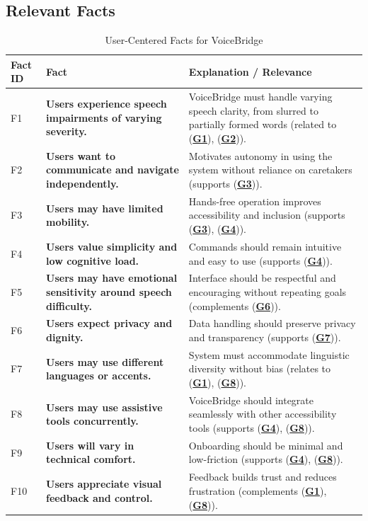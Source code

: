 \documentclass[11pt]{article}
\begin{document}
\subsection{Relevant Facts}

\begin{table}[H]
\centering
\begin{tabularx}{\textwidth}{p{1cm}p{6cm}X}
\toprule {\textbf{Fact ID}} & {\textbf{Fact}} & {\textbf{Explanation / Relevance}}\\
\midrule
F1 & \textbf{Users experience speech impairments of varying severity.} & VoiceBridge must handle varying speech clarity, from slurred to partially formed words (related to (\textbf{\hyperref[tab:project-goals]{G1}}), (\textbf{\hyperref[tab:project-goals]{G2}})). \\ \hline
F2 & \textbf{Users want to communicate and navigate independently.} & Motivates autonomy in using the system without reliance on caretakers (supports (\textbf{\hyperref[tab:project-goals]{G3}})). \\ \hline
F3 & \textbf{Users may have limited mobility.} & Hands-free operation improves accessibility and inclusion (supports (\textbf{\hyperref[tab:project-goals]{G3}}), (\textbf{\hyperref[tab:project-goals]{G4}})). \\ \hline
F4 & \textbf{Users value simplicity and low cognitive load.} & Commands should remain intuitive and easy to use (supports (\textbf{\hyperref[tab:project-goals]{G4}})). \\ \hline
F5 & \textbf{Users may have emotional sensitivity around speech difficulty.} & Interface should be respectful and encouraging without repeating goals (complements (\textbf{\hyperref[tab:project-goals]{G6}})). \\ \hline
F6 & \textbf{Users expect privacy and dignity.} & Data handling should preserve privacy and transparency (supports (\textbf{\hyperref[tab:project-goals]{G7}})). \\ \hline
F7 & \textbf{Users may use different languages or accents.} & System must accommodate linguistic diversity without bias (relates to (\textbf{\hyperref[tab:project-goals]{G1}}), (\textbf{\hyperref[tab:project-goals]{G8}})). \\ \hline
F8 & \textbf{Users may use assistive tools concurrently.} & VoiceBridge should integrate seamlessly with other accessibility tools (supports (\textbf{\hyperref[tab:project-goals]{G4}}), (\textbf{\hyperref[tab:project-goals]{G8}})). \\ \hline
F9 & \textbf{Users will vary in technical comfort.} & Onboarding should be minimal and low-friction (supports (\textbf{\hyperref[tab:project-goals]{G4}}), (\textbf{\hyperref[tab:project-goals]{G8}})). \\ \hline
F10 & \textbf{Users appreciate visual feedback and control.} & Feedback builds trust and reduces frustration (complements (\textbf{\hyperref[tab:project-goals]{G1}}), (\textbf{\hyperref[tab:project-goals]{G8}})). \\
\bottomrule
\end{tabularx}
\caption{User-Centered Facts for VoiceBridge}
\end{table}
\end{document}
